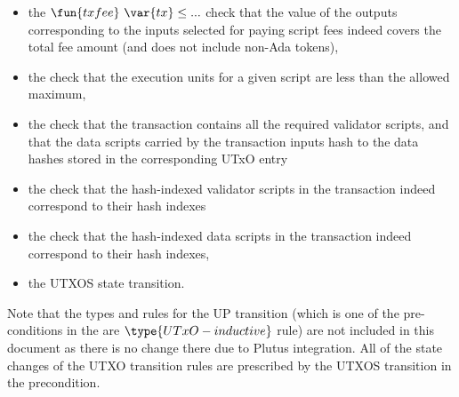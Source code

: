 \begin{itemize}
  \item the $\fun{txfee}~\var{tx} \leq ...$ check
  that the value of the outputs corresponding to the inputs selected
  for paying script fees indeed covers the total fee amount (and does not
  include non-Ada tokens),

  \item the check that the execution units for a given script are less than
  the allowed maximum,

  \item the check that the transaction contains all the required validator
  scripts, and that the data scripts carried by the transaction inputs hash to the
  data hashes stored in the corresponding UTxO entry

  \item the check that the hash-indexed validator scripts in the transaction
  indeed correspond to their hash indexes

  \item the check that the hash-indexed data scripts in the
  transaction indeed correspond to their hash indexes,

  \item the UTXOS state transition.
\end{itemize}

Note that the types and rules for the UP transition (which is one of the
pre-conditions in the are $\type{UTxO-inductive}$ rule) are not included
in this document as there is no change there due to Plutus integration.
All of the state changes of the UTXO transition rules are prescribed by
the UTXOS transition in the precondition.



